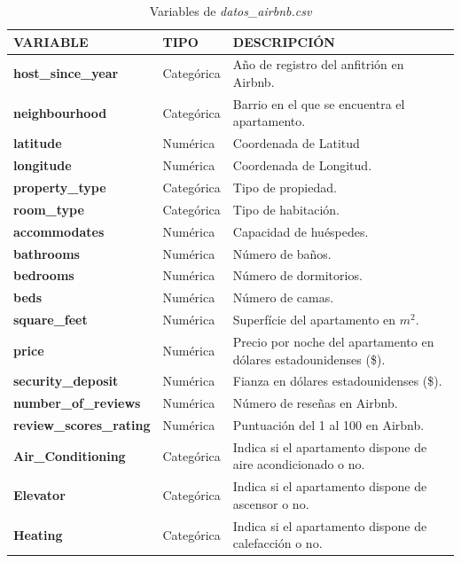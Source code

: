 \documentclass{article}
\begin{document}
\begin{xltabular}{\linewidth}{ l | X | X}
  \caption{Variables de \emph{datos\_airbnb.csv}} 
 \label{table: vardescription}\\
 \hline \hline \hline

\textbf{\normalsize VARIABLE} & \textbf{\normalsize TIPO} & \textbf{\normalsize DESCRIPCIÓN}  \\
 \hline 
\endhead

\textbf{host\_since\_year} & Categórica & Año de registro del anfitrión en Airbnb. \\ \hline 
\textbf{neighbourhood} & Categórica & Barrio en el que se encuentra el apartamento. \\ \hline 
\textbf{latitude} & Numérica & Coordenada de Latitud \\ \hline 
\textbf{longitude} & Numérica & Coordenada de Longitud. \\ \hline 
\textbf{property\_type} & Categórica & Tipo de propiedad.\\ \hline 
\textbf{room\_type} & Categórica & Tipo de habitación. \\ \hline 
\textbf{accommodates} & Numérica & Capacidad de huéspedes. \\ \hline 
\textbf{bathrooms} & Numérica & Número de baños. \\ \hline 
\textbf{bedrooms} & Numérica & Número de dormitorios. \\ \hline 
\textbf{beds} & Numérica & Número de camas. \\ \hline 
\textbf{square\_feet} & Numérica & Superfície del apartamento en $m^{2}$. \\ \hline 
\textbf{price} & Numérica & Precio por noche del apartamento en dólares estadounidenses (\$). \\ \hline 
\textbf{security\_deposit} & Numérica & Fianza en dólares estadounidenses (\$). \\ \hline 
\textbf{number\_of\_reviews} & Numérica & Número de reseñas en Airbnb. \\ \hline 
\textbf{review\_scores\_rating} & Numérica & Puntuación del 1 al 100 en Airbnb. \\ \hline 
\textbf{Air\_Conditioning} & Categórica & Indica si el apartamento dispone de aire acondicionado o no. \\ \hline 
\textbf{Elevator} & Categórica & Indica si el apartamento dispone de ascensor o no. \\ \hline 
\textbf{Heating} & Categórica & Indica si el apartamento dispone de calefacción o no.\\ \hline 

\end{xltabular}
\end{document}
